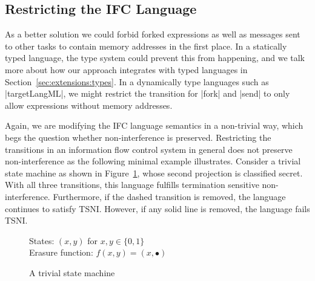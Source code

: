 \subsection{Restricting the IFC Language}

As a better solution we could forbid forked expressions as well
as messages sent to other tasks to contain memory addresses in the
first place.  In a statically typed language, the type system could
prevent this from happening, and we talk more about how our
approach integrates with typed languages in
Section~\ref{sec:extensions:types}.
In a dynamically type languages such as |targetLangML|, we might
restrict the transition for |fork| and |send| to only allow expressions
without memory addresses.

Again, we are modifying the IFC language semantics in a non-trivial way,
which begs the question whether non-interference is preserved.
Restricting the transitions in an information flow control
system in general does not preserve non-interference as the following
minimal example illustrates.  
Consider a trivial state machine as shown
in Figure~\ref{fig:trivial-sm}, whose second projection is classified
secret.  With all three transitions, this language fulfills
termination sensitive non-interference.  Furthermore, if the
dashed transition
is removed, the language continues to satisfy TSNI.  However, if any
solid line is removed, the language fails TSNI.

\begin{figure}
  States: $(x,y)$ for $x,y \in \{0,1\}$ \\
  Erasure function: $f(x,y) = (x,\bullet)$
  
  \begin{center}\end{center}
  
  \label{fig:trivial-sm}
  \caption{A trivial state machine}
\end{figure}

